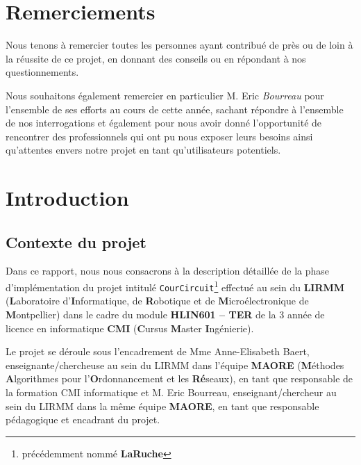 \documentclass[a4paper,12pt]{report}
\theoremstyle{break}
\theoremstyle{break}
\theoremstyle{break}
\theoremstyle{break}
\theoremstyle{definition}
\theoremstyle{remark}
\begin{document}
\chapter*{Remerciements}
Nous tenons à remercier toutes les personnes ayant contribué de près ou de loin à la réussite de ce projet, en donnant des conseils ou en répondant à nos questionnements.

  Nous souhaitons également remercier en particulier M. Eric \textit{Bourreau} pour l'ensemble de ses efforts au cours de cette année, sachant répondre à l'ensemble de nos interrogations et également pour nous avoir donné l'opportunité de rencontrer des professionnels qui ont pu nous exposer leurs besoins ainsi qu'attentes envers notre projet en tant qu'utilisateurs potentiels.

\chapter{Introduction}
\setcounter{page}{1}
\section{Contexte du projet}
Dans ce rapport, nous nous consacrons à la description détaillée de la phase d'implémentation du projet intitulé \texttt{CourCircuit}\footnote{précédemment nommé \textbf{LaRuche}} effectué au sein du \textbf{LIRMM} (\textbf{L}aboratoire d'\textbf{I}nformatique, de \textbf{R}obotique et de \textbf{M}icroélectronique de \textbf{M}ontpellier) dans le cadre du module \textbf{HLIN601 -- TER} de la $3$\ieme{} année de licence en informatique \textbf{CMI} (\textbf{C}ursus \textbf{M}aster \textbf{I}ngénierie).

Le projet se déroule sous l'encadrement de Mme Anne-Elisabeth Baert, enseignante/chercheuse au sein du LIRMM dans l'équipe \textbf{MAORE} (\textbf{M}éthodes \textbf{A}lgorithmes pour l'\textbf{O}rdonnancement et les \textbf{Ré}seaux), en tant que responsable de la formation CMI informatique et M. Eric Bourreau, enseignant/chercheur au sein du LIRMM dans la même équipe \textbf{MAORE}, en tant que responsable pédagogique et encadrant du projet.
\end{document}
